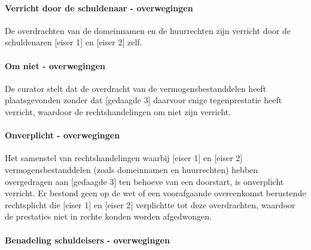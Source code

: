 \documentclass[
  dutch,
  a4paper,
]{article}
\begin{document}
\paragraph{Verricht door de schuldenaar - overwegingen}\label{verricht-door-de-schuldenaar---overwegingen-26}

De overdrachten van de domeinnamen en de huurrechten zijn verricht door de schuldenaren {[}eiser 1{]} en {[}eiser 2{]} zelf.

\paragraph{Om niet - overwegingen}\label{om-niet---overwegingen-26}

De curator stelt dat de overdracht van de vermogensbestanddelen heeft plaatsgevonden zonder dat {[}gedaagde 3{]} daarvoor enige tegenprestatie heeft verricht, waardoor de rechtshandelingen om niet zijn verricht.

\paragraph{Onverplicht - overwegingen}\label{onverplicht---overwegingen-26}

Het samenstel van rechtshandelingen waarbij {[}eiser 1{]} en {[}eiser 2{]} vermogensbestanddelen (zoals domeinnamen en huurrechten) hebben overgedragen aan {[}gedaagde 3{]} ten behoeve van een doorstart, is onverplicht verricht. Er bestond geen op de wet of een voorafgaande overeenkomst berustende rechtsplicht die {[}eiser 1{]} en {[}eiser 2{]} verplichtte tot deze overdrachten, waardoor de prestaties niet in rechte konden worden afgedwongen.

\paragraph{Benadeling schuldeisers - overwegingen}\label{benadeling-schuldeisers---overwegingen-26}
\end{document}
